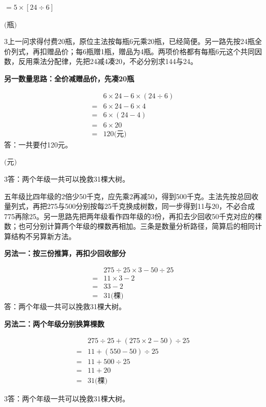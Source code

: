\documentclass[multi=snippet,border={5bp 20bp 5bp 5bp}]{standalone}
\newenvironment{snippet}[3]{\begin{minipage}{#1bp}\color{answerred}\fontsize{#2}{#3}\selectfont\raggedright}{\end{minipage}}
\begin{document}
\begin{snippet}{67.43834838867188}{9}{12.8}\SourceSans\setlength{\mathindent}{2bp}\(\displaystyle=5\times[24\div6]\)\end{snippet}
\begin{snippet}{80}{9.5}{14}\SourceSans\setlength{\mathindent}{2bp}\(\text{(瓶)}\)\end{snippet}
\begin{snippet}{505}{11.5}{14}\begin{multicols}{3}\raggedcolumns 上一问求得付费20瓶，原位主法按每瓶6元乘20瓶，已经简便。另一路先按24瓶全价列式，再扣赠品价；每6瓶赠1瓶，赠品为4瓶。两项价格都有每瓶6元这个共同因数，反用乘法分配律，先把24减4凑20，不必分别求144与24。\par \textbf{另一数量思路：全价减赠品价，先凑20瓶}\par \[\begin{aligned}&6\times24-6\times(24\div6)\\={}&6\times24-6\times4\\={}&6\times(24-4)\\={}&6\times20\\={}&120\text{(元)}\end{aligned}\]答：一共要付120元。\end{multicols}\end{snippet}
\begin{snippet}{80}{9.5}{14}\SourceSans\setlength{\mathindent}{2bp}\(\text{(元)}\)\end{snippet}
\begin{snippet}{505}{11.5}{14}\begin{multicols}{3}\raggedcolumns 答：两个年级一共可以挽救31棵大树。\par 五年级比四年级的2倍少50千克，应先乘2再减50，得到500千克。主法先按总回收量列式，再把275与500分别按每25千克换成树数，同一步得到11与20，不必合成775再除25。另一思路先把两年级看作四年级的3份，再扣去少回收50千克对应的棵数；也可分别计算两个年级的棵数再相加。三条是数量分析路径，简算后的相同计算结构不另算新方法。\par \textbf{另法一：按三份推算，再扣少回收部分}\par \[\begin{aligned}&275\div25\times3-50\div25\\={}&11\times3-2\\={}&33-2\\={}&31\text{(棵)}\end{aligned}\]答：两个年级一共可以挽救31棵大树。\par \textbf{另法二：两个年级分别换算棵数}\par \end{multicols}\[\begin{aligned}&275\div25+(275\times2-50)\div25\\={}&11+(550-50)\div25\\={}&11+500\div25\\={}&11+20\\={}&31\text{(棵)}\end{aligned}\]\begin{multicols}{3}\raggedcolumns 答：两个年级一共可以挽救31棵大树。\end{multicols}\end{snippet}
\end{document}
